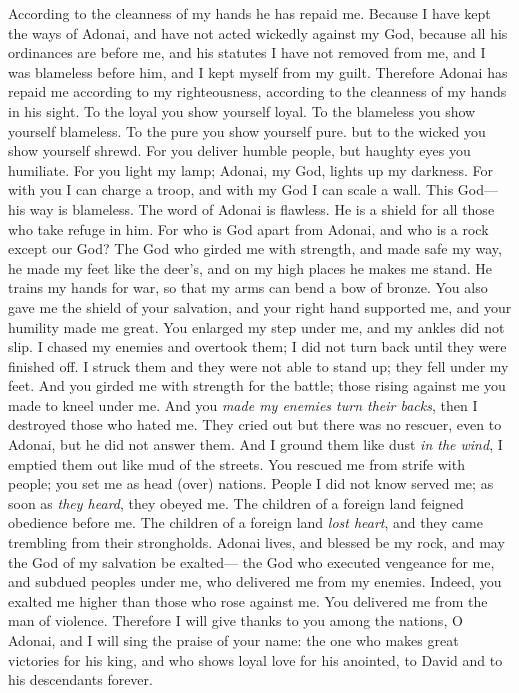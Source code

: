 \begin{biblechapter}
According to the cleanness of my hands 
he has repaid me.
\verse Because I have kept the ways of Adonai, 
and have not acted wickedly against my God,
\verse because all his ordinances are before me, 
and his statutes I have not removed from me,
\verse and I was blameless before him, 
and I kept myself from my guilt.
\verse Therefore Adonai has repaid me according to my righteousness, 
according to the cleanness of my hands in his sight.
\verse To the loyal you show yourself loyal. 
To the blameless you show yourself blameless.
\verse To the pure you show yourself pure. 
but to the wicked you show yourself shrewd.
\verse For you deliver humble people, 
but haughty eyes you humiliate.
\verse For you light my lamp; 
Adonai, my God, lights up my darkness.
\verse For with you I can charge a troop, 
and with my God I can scale a wall.
\verse This God—his way is blameless. 
The word of Adonai is flawless. 
He is a shield for all those who take refuge in him.
\verse For who is God apart from Adonai, 
and who is a rock except our God?
\verse The God who girded me with strength, 
and made safe my way,
\verse he made my feet like the deer’s, 
and on my high places he makes me stand.
\verse He trains my hands for war, 
so that my arms can bend a bow of bronze.
\verse You also gave me the shield of your salvation, 
and your right hand supported me, 
and your humility made me great.
\verse You enlarged my step under me, 
and my ankles did not slip.
\verse I chased my enemies and overtook them; 
I did not turn back until they were finished off.
\verse I struck them and they were not able to stand up; 
they fell under my feet.
\verse And you girded me with strength for the battle; 
those rising against me you made to kneel under me.
\verse And you \textit{made my enemies turn their backs}, 
then I destroyed those who hated me.
\verse They cried out but there was no rescuer, 
even to Adonai, but he did not answer them.
\verse And I ground them like dust \textit{in the wind}, 
I emptied them out like mud of the streets.
\verse You rescued me from strife with people; 
you set me as head (over) nations. 
People I did not know served me;
\verse as soon as \textit{they heard}, they obeyed me. 
The children of a foreign land feigned obedience before me.
\verse The children of a foreign land \textit{lost heart}, 
and they came trembling from their strongholds.
\verse Adonai lives, and blessed be my rock, 
and may the God of my salvation be exalted—
\verse the God who executed vengeance for me, 
and subdued peoples under me,
\verse who delivered me from my enemies. 
Indeed, you exalted me higher than those who rose against me. 
You delivered me from the man of violence.
\verse Therefore I will give thanks to you among the nations, O Adonai, 
and I will sing the praise of your name:
\verse the one who makes great victories for his king, 
and who shows loyal love for his anointed, 
to David and to his descendants forever.
\end{biblechapter}

